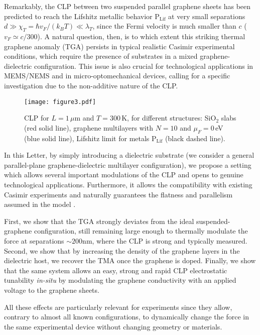 \documentclass[aps,pra,superscriptaddress,amsmath,amssymb,showpacs,twocolumn,notitlepage]{revtex4-1}
\begin{document}
{Remarkably, the CLP between two suspended parallel graphene sheets has been predicted \cite{Gomez09} to reach the Lifshitz metallic behavior $\textrm{P}_{\textrm{Lif}}$ at very small separations 
$d\gg \chi_T=\hbar v_F/(k_B T)\ll\lambda_T$, since the Fermi velocity is much smaller than $c$ ($v_F\simeq c/300$).  A natural question, then, is to which extent this striking thermal graphene anomaly (TGA) persists in typical realistic Casimir experimental conditions, which require the presence of substrates \cite{Banishev13,Lamoreaux} in a mixed graphene-dielectric configuration. This issue is also crucial for technological applications in MEMS/NEMS and in micro-optomechanical devices, calling for a  specific investigation due to the non-additive nature of the CLP. 

\begin{figure}[!ht]
\texttt{[image: figure3.pdf]}
\caption{\footnotesize CLP for $L=1\,\mu$m and $T=300\,$K, for different structures: SiO$_2$ slabs (red solid line),  graphene multilayers with $N=10$ and $\mu_F=0\,$eV (blue solid line), Lifshitz limit for metals $\textrm{P}_{\textrm{Lif}}$ (black dashed line). \label{fig:figure_3}}
\end{figure}

In this Letter, by simply introducing a dielectric substrate (we consider a general parallel-plane graphene-dielectric multilayer configuration), we propose a setting which allows several important modulations of the CLP and opens to genuine technological applications. Furthermore, it allows the compatibility with existing Casimir experiments and naturally guarantees the flatness and parallelism assumed in the model \cite{Gomez09}.




First, we show that the TGA strongly deviates from the ideal suspended-graphene configuration, still remaining large enough to thermally modulate the force at separations $\sim 200$nm, where the CLP is strong and typically measured. Second, we show that by increasing the density of the graphene layers in the dielectric host, we recover the TMA once the graphene is doped. Finally, we show that the same system allows an easy, strong and rapid CLP electrostatic tunability \emph{in-situ} by modulating the graphene conductivity with an applied voltage to the graphene sheets.

All these effects are particularly relevant for experiments since they allow, contrary to almost all known configurations, to dynamically change the force in the same experimental device without changing geometry or materials.}
\end{document}
